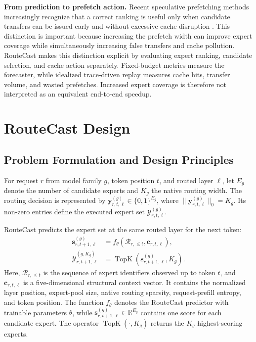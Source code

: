 \documentclass[conference]{IEEEtran}
\begin{document}
\textbf{From prediction to prefetch action.}
Recent speculative prefetching methods increasingly recognize that a correct
ranking is useful only when candidate transfers can be issued early and
without excessive cache disruption \cite{specmd,specprefetch}. This distinction
is important because increasing the prefetch width can improve expert coverage
while simultaneously increasing false transfers and cache pollution.
RouteCast makes this distinction explicit by evaluating expert ranking,
candidate selection, and cache action separately. Fixed-budget metrics measure
the forecaster, while idealized trace-driven replay measures cache hits, transfer volume,
and wasted prefetches. Increased expert coverage is therefore not interpreted
as an equivalent end-to-end speedup.

\section{RouteCast Design}
\subsection{Problem Formulation and Design Principles}

For request \(r\) from model family \(g\), token position \(t\), and routed
layer \(\ell\), let \(E_g\) denote the number of candidate experts and \(K_g\)
the native routing width. The routing decision is represented by
\(\mathbf{y}_{r,t,\ell}^{(g)}\in\{0,1\}^{E_g}\), where
\(\|\mathbf{y}_{r,t,\ell}^{(g)}\|_0=K_g\). Its non-zero entries define the
executed expert set \(\mathcal{Y}_{r,t,\ell}^{(g)}\).

RouteCast predicts the expert set at the same routed layer for the next token:
\begin{align}
\mathbf{s}_{r,t+1,\ell}^{(g)}
&=
f_{\theta}\!\left(
\mathcal{R}_{r,\leq t},
\mathbf{c}_{r,t,\ell}
\right), \\
\widehat{\mathcal{Y}}_{r,t+1,\ell}^{(g,K_g)}
&=
\operatorname{TopK}\!\left(
\mathbf{s}_{r,t+1,\ell}^{(g)},K_g
\right).
\label{eq:task}
\end{align}
Here, $\mathcal{R}_{r,\leq t}$ is the sequence of expert identifiers observed
up to token $t$, and $\mathbf{c}_{r,t,\ell}$ is a five-dimensional structural
context vector. It contains the normalized layer position, expert-pool size,
native routing sparsity, request-prefill entropy, and token position. The
function \(f_{\theta}\) denotes the RouteCast predictor with trainable
parameters \(\theta\), while
\(\mathbf{s}_{r,t+1,\ell}^{(g)}\in\mathbb{R}^{E_g}\) contains one score for
each candidate expert. The operator \(\operatorname{TopK}(\cdot,K_g)\)
returns the \(K_g\) highest-scoring experts.
\end{document}
